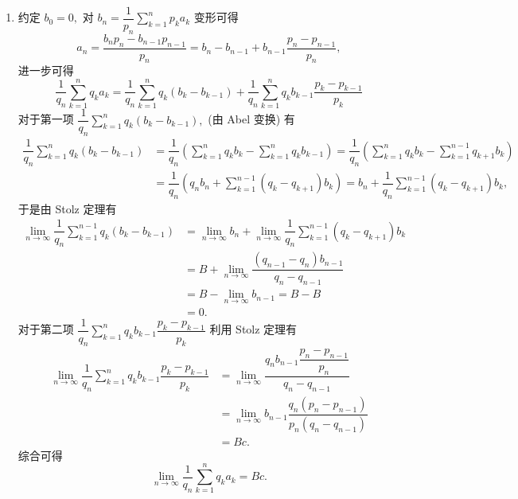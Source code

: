 \begin{solution}
\begin{enumerate}
\item 约定 $b_0 = 0,$ 对 $\displaystyle b_n = \dfrac{1}{p_n} \sum\limits_{k=1}^n p_ka_k$ 变形可得
\begin{equation*}
a_n = \dfrac{b_np_n - b_{n-1}p_{n-1}}{p_n} = b_n - b_{n-1} + b_{n-1}\dfrac{p_n-p_{n-1}}{p_n},
\end{equation*}
进一步可得
\begin{equation*}
\dfrac{1}{q_n} \sum\limits_{k=1}^n q_ka_k = \dfrac{1}{q_n} \sum\limits_{k=1}^n q_k(b_k - b_{k-1}) + \dfrac{1}{q_n} \sum\limits_{k=1}^n q_k b_{k-1}\dfrac{p_k-p_{k-1}}{p_k}
\end{equation*}
对于第一项 $\displaystyle \dfrac{1}{q_n} \sum\limits_{k=1}^n q_k(b_k - b_{k-1}),$ (由 Abel 变换) 有
\begin{align*}
\dfrac{1}{q_n} \sum\limits_{k=1}^n q_k(b_k - b_{k-1}) & = \dfrac{1}{q_n} \left( \sum\limits_{k=1}^n q_kb_k - \sum\limits_{k=1}^n q_kb_{k-1} \right) = \dfrac{1}{q_n} \left( \sum\limits_{k=1}^n q_kb_k - \sum\limits_{k=1}^{n-1} q_{k+1}b_k \right) \\
& = \dfrac{1}{q_n} \left( q_nb_n + \sum\limits_{k=1}^{n-1} (q_k - q_{k+1})b_k \right) = b_n + \dfrac{1}{q_n} \sum\limits_{k=1}^{n-1} (q_k - q_{k+1})b_k,
\end{align*}
于是由 Stolz 定理有
\begin{align*}
\lim_{n \to \infty} \dfrac{1}{q_n} \sum\limits_{k=1}^{n-1} q_k(b_k - b_{k-1}) & = \lim_{n \to \infty} b_n + \lim_{n \to \infty} \dfrac{1}{q_n} \sum\limits_{k=1}^{n-1} (q_k - q_{k+1})b_k \\
& = B + \lim_{n \to \infty} \dfrac{(q_{n-1} - q_n)b_{n-1}}{q_n - q_{n-1}} \\
& = B - \lim_{n \to \infty} b_{n-1} = B - B \\
& = 0.
\end{align*}
对于第二项 $\displaystyle \dfrac{1}{q_n} \sum\limits_{k=1}^n q_k b_{k-1}\dfrac{p_k-p_{k-1}}{p_k}$ 利用 Stolz 定理有
\begin{align*}
\lim_{n \to \infty} \dfrac{1}{q_n} \sum\limits_{k=1}^n q_k b_{k-1}\dfrac{p_k-p_{k-1}}{p_k} & = \lim_{n \to \infty} \dfrac{q_n b_{n-1}\dfrac{p_n-p_{n-1}}{p_n}}{q_n-q_{n-1}} \\
& = \lim_{n \to \infty} b_{n-1} \dfrac{q_n(p_n-p_{n-1})}{p_n(q_n-q_{n-1})} \\
& = Bc.
\end{align*}
综合可得
\begin{equation*}
\lim_{n \to \infty} \dfrac{1}{q_n} \sum\limits_{k=1}^n q_ka_k = Bc.
\end{equation*}


\end{enumerate}
\end{solution}
